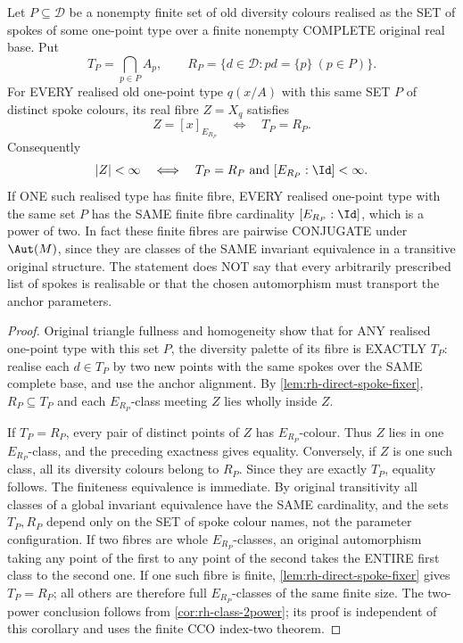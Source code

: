 \begin{corollary}
\label{cor:rh-fibre-spoke-set-uniformity}
Let $P\subseteq\mathcal D$ be
a nonempty finite set of
old diversity colours realised
as the SET of spokes of
some one-point type over
a finite nonempty COMPLETE
original real base.
Put
\[
       T_P=\bigcap_{p\in P}A_p,
       \qquad
       R_P=\{d\in\mathcal D:
                            pd=\{p\}\ (p\in P)\}.
\]
For EVERY realised old
one-point type $q(x/A)$
with this same SET $P$ of
distinct spoke colours,
its real fibre $Z=X_q$
satisfies
\[
 Z=[x]_{E_{R_P}}
       \quad\Longleftrightarrow\quad
                     T_P=R_P.
\]
Consequently
\[
 |Z|<\infty
 \quad\Longleftrightarrow\quad
 T_P=R_P\ \text{and}\ 
              [E_{R_P}:\Id]<\infty.
\]
If ONE such realised type has
finite fibre, EVERY realised
one-point type with the same
set $P$ has the SAME finite
fibre cardinality
$[E_{R_P}:\Id]$, which is a
power of two. In fact these
finite fibres are pairwise
CONJUGATE under
$\Aut(M)$, since they are
classes of the SAME invariant
equivalence in a transitive
original structure. The
statement does NOT say that
every arbitrarily prescribed
list of spokes is realisable
or that the chosen
automorphism must transport
the anchor parameters.
\end{corollary}
\begin{proof}
Original triangle fullness
and homogeneity show that
for ANY realised one-point
type with this set $P$,
the diversity palette of
its fibre is EXACTLY $T_P$:
realise each
$d\in T_P$ by two new
points with the same
spokes over the SAME
complete base, and
use the anchor alignment.
By
\cref{lem:rh-direct-spoke-fixer},
$R_P\subseteq T_P$ and
each $E_{R_P}$-class
meeting $Z$ lies wholly
inside $Z$.

If $T_P=R_P$, every pair
of distinct points of $Z$
has $E_{R_P}$-colour.
Thus $Z$ lies in one
$E_{R_P}$-class, and
the preceding exactness
gives equality.
Conversely, if $Z$ is
one such class, all
its diversity colours
belong to $R_P$.
Since they are exactly
$T_P$, equality follows.
The finiteness equivalence
is immediate. By original
transitivity all classes
of a global invariant
equivalence have the SAME
cardinality, and the
sets $T_P,R_P$ depend
only on the SET of spoke
colour names, not the
parameter configuration.
If two fibres are whole
$E_{R_P}$-classes, an
original automorphism taking
any point of the first to
any point of the second
takes the ENTIRE first class
to the second one.
If one such fibre is finite,
\cref{lem:rh-direct-spoke-fixer}
gives $T_P=R_P$; all
others are therefore full
$E_{R_P}$-classes of the
same finite size.
The two-power conclusion
follows from
\cref{cor:rh-class-2power};
its proof is independent
of this corollary and
uses the finite CCO
index-two theorem.
\end{proof}

